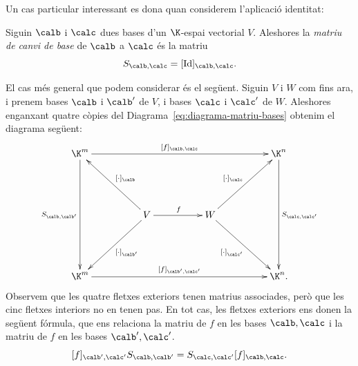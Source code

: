 Un cas particular interessant es dona quan considerem l'aplicació identitat:
\begin{definicio}
Siguin $\calb$ i $\calc$ dues bases d'un $\K$-espai vectorial $V$. Aleshores la \emph{matriu de canvi de base} de $\calb$ a $\calc$ és la matriu
\[
S_{\calb,\calc} = [\Id]_{\calb,\calc}.
\]
\end{definicio}

El cas més general que podem considerar és el següent. Siguin $V$ i $W$ com fins ara, i prenem bases $\calb$ i $\calb'$ de $V$, i bases $\calc$ i $\calc'$ de $W$. Aleshores enganxant quatre còpies del Diagrama~\eqref{eq:diagrama-matriu-bases} obtenim el diagrama següent:
\[
\xymatrix@C50pt@R50pt{
\K^m\ar[rrr]^{[f]_{\calb,\calc}}\ar[dd]_{S_{\calb,\calb'}}&&& \K^n\ar[dd]^{S_{\calc,\calc'}}\\
&V\ar[r]^f\ar[ul]_{[\cdot]_\calb}\ar[dl]^{[\cdot]_{\calb'}}&W\ar[ur]^{[\cdot]_{\calc}}\ar[dr]_{[\cdot]_{\calc'}}\\
\K^m\ar[rrr]^{[f]_{\calb',\calc'}}&&&\K^n.
}
\]
Observem que les quatre fletxes exteriors tenen matrius associades, però que les cinc fletxes interiors no en tenen pas. En tot cas, les fletxes exteriors ens donen la següent fórmula, que ens relaciona la matriu de $f$ en les bases $\calb,\calc$ i la matriu de $f$ en les bases $\calb',\calc'$.
\[
[f]_{\calb',\calc'} S_{\calb,\calb'} = S_{\calc,\calc'} [f]_{\calb,\calc}.
\]
